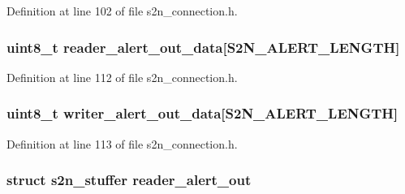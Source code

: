 Definition at line 102 of file s2n\+\_\+connection.\+h.

\subsubsection[{\texorpdfstring{reader\+\_\+alert\+\_\+out\+\_\+data}{reader_alert_out_data}}]{\setlength{\rightskip}{0pt plus 5cm}uint8\+\_\+t reader\+\_\+alert\+\_\+out\+\_\+data\mbox{[}{\bf S2\+N\+\_\+\+A\+L\+E\+R\+T\+\_\+\+L\+E\+N\+G\+TH}\mbox{]}}\hypertarget{structs2n__connection_a3e8c16136106e623cd0ee50701aaf141}{}\label{structs2n__connection_a3e8c16136106e623cd0ee50701aaf141}


Definition at line 112 of file s2n\+\_\+connection.\+h.

\subsubsection[{\texorpdfstring{writer\+\_\+alert\+\_\+out\+\_\+data}{writer_alert_out_data}}]{\setlength{\rightskip}{0pt plus 5cm}uint8\+\_\+t writer\+\_\+alert\+\_\+out\+\_\+data\mbox{[}{\bf S2\+N\+\_\+\+A\+L\+E\+R\+T\+\_\+\+L\+E\+N\+G\+TH}\mbox{]}}\hypertarget{structs2n__connection_a950afe753c3200576cd4b083404a2e5a}{}\label{structs2n__connection_a950afe753c3200576cd4b083404a2e5a}


Definition at line 113 of file s2n\+\_\+connection.\+h.

\subsubsection[{\texorpdfstring{reader\+\_\+alert\+\_\+out}{reader_alert_out}}]{\setlength{\rightskip}{0pt plus 5cm}struct {\bf s2n\+\_\+stuffer} reader\+\_\+alert\+\_\+out}\hypertarget{structs2n__connection_a00dd2a749a85d247561da67ec248d3e1}{}\label{structs2n__connection_a00dd2a749a85d247561da67ec248d3e1}


